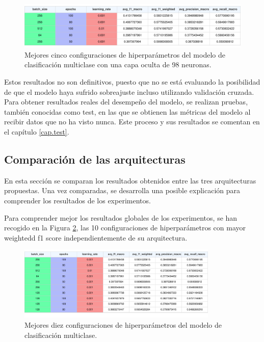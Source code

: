 \begin{figure}[H]
    \centering
    \includegraphics[width=1\textwidth]{./img/modelo/MULhs98.pdf}
    \caption{Mejores cinco configuraciones de hiperparámetros del modelo de clasificación multiclase con una capa oculta de 98 neuronas.}
    \label{fig:MULhs98}
\end{figure}

Estos resultados no son definitivos, puesto que no se está evaluando la posibilidad de que el modelo haya sufrido sobreajuste incluso utilizando validación cruzada. Para obtener resultados reales del desempeño del modelo, se realizan pruebas, también conocidas como test, en las que se obtienen las métricas del modelo al recibir datos que no ha visto nunca. Este proceso y sus resultados se comentan en el capítulo \ref{cap.test}.


\subsection{Comparación de las arquitecturas}\label{sec:comp.MUL}
En esta sección se comparan los resultados obtenidos entre las tres arquitecturas propuestas. Una vez comparadas, se desarrolla una posible explicación para comprender los resultados de los experimentos.

Para comprender mejor los resultados globales de los experimentos, se han recogido en la Figura \ref{fig:MULtop10}, las 10 configuraciones de hiperparámetros con mayor weightedd f1 score independientemente de su arquitectura.

\begin{figure}[H]
    \centering
    \includegraphics[width=0.85\textwidth]{./img/modelo/MULtop10.pdf}
    \caption{Mejores diez configuraciones de hiperparámetros del modelo de clasificación multiclase.}
    \label{fig:MULtop10}
\end{figure}

